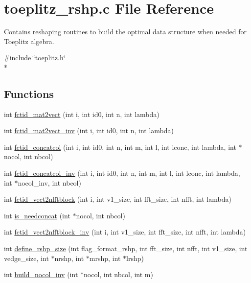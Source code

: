\section{toeplitz\-\_\-rshp.\-c File Reference}
\label{toeplitz__rshp_8c}


Contains reshaping routines to build the optimal data structure when needed for Toeplitz algebra.  


{\ttfamily \#include \char`\"{}toeplitz.\-h\char`\"{}}\\*
\subsection*{Functions}
\begin{DoxyCompactItemize}
\item 
int \hyperlink{toeplitz__rshp_8c_ab939dbb745b7f484b6ea199bb97b8047}{fctid\-\_\-mat2vect} (int i, int id0, int n, int lambda)
\item 
int \hyperlink{toeplitz__rshp_8c_ae78ae0f7f2d99a5784932da5623faec1}{fctid\-\_\-mat2vect\-\_\-inv} (int i, int id0, int n, int lambda)
\item 
int \hyperlink{toeplitz__rshp_8c_a60fd6d5e5ef75b619c6709bfc6c285cf}{fctid\-\_\-concatcol} (int i, int id0, int n, int m, int l, int lconc, int lambda, int $\ast$nocol, int nbcol)
\item 
int \hyperlink{toeplitz__rshp_8c_a548030b0dd8348a79e837aac51482962}{fctid\-\_\-concatcol\-\_\-inv} (int i, int id0, int n, int m, int l, int lconc, int lambda, int $\ast$nocol\-\_\-inv, int nbcol)
\item 
int \hyperlink{toeplitz__rshp_8c_ac9c1b645a62e6a958eac0bdf7ad622c8}{fctid\-\_\-vect2nfftblock} (int i, int v1\-\_\-size, int fft\-\_\-size, int nfft, int lambda)
\item 
int \hyperlink{toeplitz__rshp_8c_a466af9471a3e62e38234b3a861f18621}{is\-\_\-needconcat} (int $\ast$nocol, int nbcol)
\item 
int \hyperlink{toeplitz__rshp_8c_a535af30fa6acfde1c5369820fe8a20d7}{fctid\-\_\-vect2nfftblock\-\_\-inv} (int i, int v1\-\_\-size, int fft\-\_\-size, int nfft, int lambda)
\item 
int \hyperlink{toeplitz__rshp_8c_a2f7b2601a9a5e73c83546978b6a1a35a}{define\-\_\-rshp\-\_\-size} (int flag\-\_\-format\-\_\-rshp, int fft\-\_\-size, int nfft, int v1\-\_\-size, int vedge\-\_\-size, int $\ast$nrshp, int $\ast$mrshp, int $\ast$lrshp)
\item 
int \hyperlink{toeplitz__rshp_8c_a4e4d58a32816e9e5ffb6dd8d95b943b6}{build\-\_\-nocol\-\_\-inv} (int $\ast$nocol, int nbcol, int m)

\end{DoxyCompactItemize}
